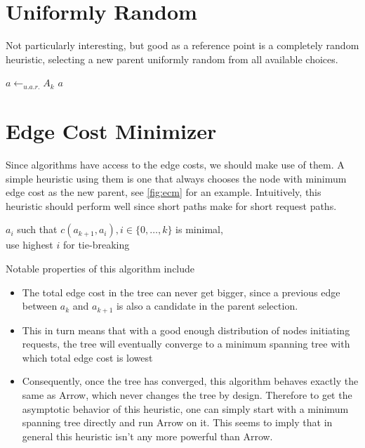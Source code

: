 \documentclass[a4paper, oneside]{discothesis}
\begin{document}
\section{Uniformly Random}

Not particularly interesting, but good as a reference point is a completely random heuristic, selecting a new parent uniformly random from all available choices.

\begin{algorithmic}
\State$a\gets_{u.a.r.}A_k$
\State\Return $a$
\EndFunction
\end{algorithmic}

\section{Edge Cost Minimizer}
\label{alg:ecm}

Since algorithms have access to the edge costs, we should make use of them. A simple heuristic using them is one that always chooses the node with minimum edge cost as the new parent, see \autoref{fig:ecm} for an example. Intuitively, this heuristic should perform well since short paths make for short request paths.
\begin{algorithmic}
\State\Return$a_i$ such that $c(a_{k+1},a_{i}),i\in\{0,\dots,k\}$ is minimal, \\\qquad use highest $i$ for tie-breaking
\EndFunction
\end{algorithmic}

Notable properties of this algorithm include
\begin{itemize}
\item The total edge cost in the tree can never get bigger, since a previous edge between $a_k$ and $a_{k+1}$ is also a candidate in the parent selection.
\item This in turn means that with a good enough distribution of nodes initiating requests, the tree will eventually converge to a minimum spanning tree with which total edge cost is lowest
\item Consequently, once the tree has converged, this algorithm behaves exactly the same as Arrow, which never changes the tree by design. Therefore to get the asymptotic behavior of this heuristic, one can simply start with a minimum spanning tree directly and run Arrow on it. This seems to imply that in general this heuristic isn't any more powerful than Arrow.
\end{itemize}
\end{document}
